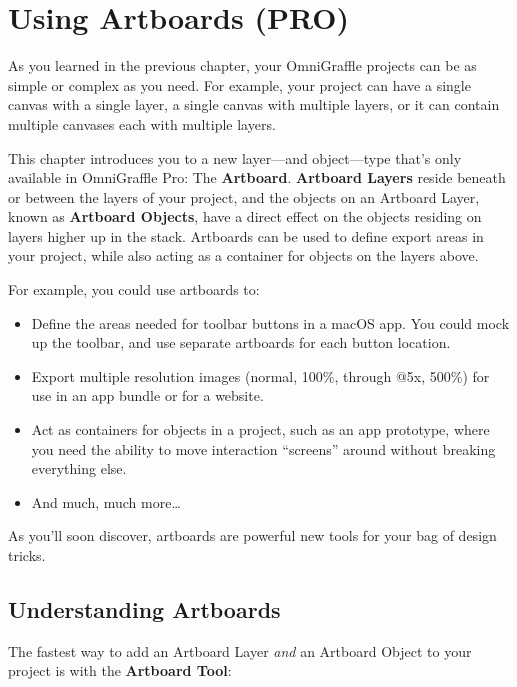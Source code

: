 \documentclass[../main.tex]{subfiles}
\begin{document}
\chapter{Using Artboards (\texorpdfstring{\textbf{PRO}}{PRO})}

As you learned in the previous chapter, your OmniGraffle projects can be as simple or complex as
you need. For example, your project can have a single canvas with a single layer, a single
canvas with multiple layers, or it can contain multiple canvases each with multiple layers.

This chapter introduces you to a new layer---and object---type that's only available in
OmniGraffle Pro: The \textbf{Artboard}. \textbf{Artboard Layers} reside beneath or between the
layers of your project, and the objects on an Artboard Layer, known as \textbf{Artboard
Objects}, have a direct effect on the objects residing on layers higher up in the stack.
Artboards can be used to define export areas in your project, while also acting as a container
for objects on the layers above.

For example, you could use artboards to:

\begin{itemize}
  \item Define the areas needed for toolbar buttons in a macOS app. You could mock up the
    toolbar, and use separate artboards for each button location.
  \item Export multiple resolution images (normal, 100\%, through @5x, 500\%) for use in an app
    bundle or for a website.
  \item Act as containers for objects in a project, such as an app prototype, where you need the
    ability to move interaction ``screens'' around without breaking everything else.
  \item And much, much more\ldots{}
\end{itemize}

As you'll soon discover, artboards are powerful new tools for your bag of design tricks.

\section{Understanding Artboards}

The fastest way to add an Artboard Layer \textit{and} an Artboard Object to your project is with
the \textbf{Artboard Tool}:
\end{document}
